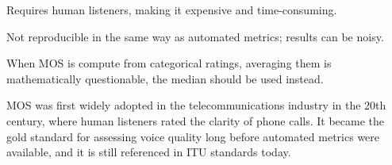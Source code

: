 {
\item Requires human listeners, making it expensive and time-consuming.
\item Not reproducible in the same way as automated metrics; results can be noisy.
\item When MOS is compute from categorical ratings, averaging them is mathematically questionable, the median should be used instead.
}

\clearpage

\thispagestyle{customstyle}

{MOS was first widely adopted in the telecommunications industry in the 20th century, where human listeners rated the clarity of phone calls.
It became the gold standard for assessing voice quality long before automated metrics were available, and it is still referenced in
ITU standards today.}